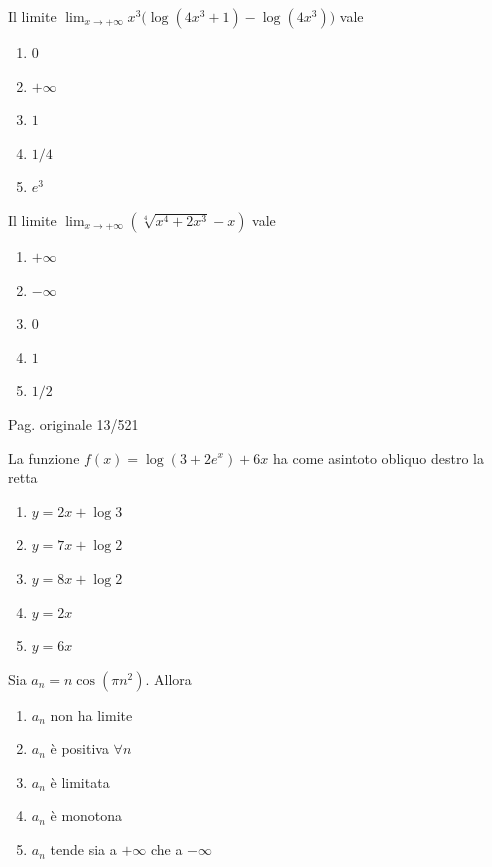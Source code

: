 \begin{quiz}
Il limite $\displaystyle\lim_{x\to+\infty}x^3\bigl(\log(4x^3+1)-\log(4x^3)\bigr)$ vale
\begin{enumerate}[label=\alph*),leftmargin=1.3cm,itemsep=3pt,topsep=5pt]
\item $0$
\item $+\infty$
\item $1$
\item $1/4$
\item $e^3$
\end{enumerate}
\end{quiz}

\begin{quiz}
Il limite $\displaystyle\lim_{x\to+\infty}(\sqrt[4]{x^4+2x^3}-x)$ vale
\begin{enumerate}[label=\alph*),leftmargin=1.3cm,itemsep=3pt,topsep=5pt]
\item $+\infty$
\item $-\infty$
\item $0$
\item $1$
\item $1/2$
\end{enumerate}
\end{quiz}

\par\noindent\hfill{\color{cyan!65!black}\scriptsize Pag. originale 13/521}\par\smallskip

\begin{quiz}
La funzione $f(x)=\log(3+2e^x)+6x$ ha come asintoto obliquo destro la retta
\begin{enumerate}[label=\alph*),leftmargin=1.3cm,itemsep=3pt,topsep=5pt]
\item $y=2x+\log3$
\item $y=7x+\log2$
\item $y=8x+\log2$
\item $y=2x$
\item $y=6x$
\end{enumerate}
\end{quiz}

\begin{quiz}
Sia $a_n=n\cos(\pi n^2)$. Allora
\begin{enumerate}[label=\alph*),leftmargin=1.3cm,itemsep=3pt,topsep=5pt]
\item $a_n$ non ha limite
\item $a_n$ \`e positiva $\forall n$
\item $a_n$ \`e limitata
\item $a_n$ \`e monotona
\item $a_n$ tende sia a $+\infty$ che a $-\infty$
\end{enumerate}
\end{quiz}

